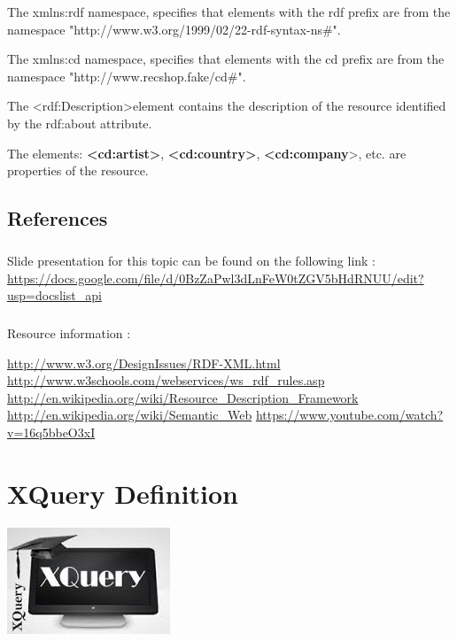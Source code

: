 \documentclass[a4paper,11pt]{report}
\begin{document}
The xmlns:rdf namespace, specifies that elements with the rdf prefix are from the namespace "http://www.w3.org/1999/02/22-rdf-syntax-ns\#".

The xmlns:cd namespace, specifies that elements with the cd prefix are from the namespace "http://www.recshop.fake/cd\#".

The \textless rdf:Description\textgreater element contains the description of the resource identified by the rdf:about attribute.

The elements: \textbf{\textless cd:artist\textgreater}, \textbf{\textless cd:country\textgreater}, \textbf{\textless cd:company}\textgreater, etc. are properties of the resource.





\section{References}
\paragraph{}
Slide presentation for this topic can be found on the following link : \url{https://docs.google.com/file/d/0BzZaPwl3dLnFeW0tZGV5bHdRNUU/edit?usp=docslist_api}

\paragraph{}
Resource information : 

\url{http://www.w3.org/DesignIssues/RDF-XML.html}
\url{http://www.w3schools.com/webservices/ws_rdf_rules.asp}
\url{http://en.wikipedia.org/wiki/Resource_Description_Framework}
\url{http://en.wikipedia.org/wiki/Semantic_Web}
\url{https://www.youtube.com/watch?v=16q5bbeO3xI}

\chapter{XQuery Definition}

\begin{center}
\includegraphics{images/xquery_image.jpeg}~\\[1cm]

\end{center}
\end{document}
